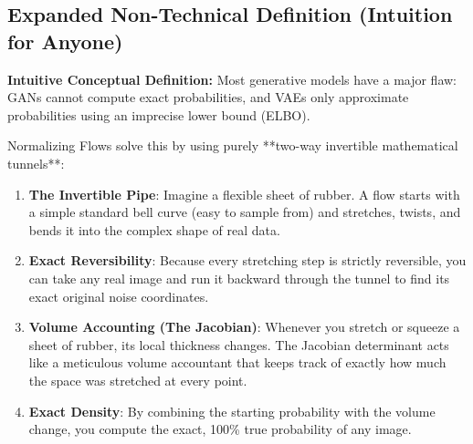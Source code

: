 \documentclass[11pt,a4paper]{article}
\theoremstyle{definition}
\begin{document}
\subsection{Expanded Non-Technical Definition (Intuition for Anyone)}
\textbf{Intuitive Conceptual Definition:}
Most generative models have a major flaw: GANs cannot compute exact probabilities, and VAEs only approximate probabilities using an imprecise lower bound (ELBO).

Normalizing Flows solve this by using purely **two-way invertible mathematical tunnels**:
\begin{enumerate}
    \item \textbf{The Invertible Pipe}: Imagine a flexible sheet of rubber. A flow starts with a simple standard bell curve (easy to sample from) and stretches, twists, and bends it into the complex shape of real data.
    \item \textbf{Exact Reversibility}: Because every stretching step is strictly reversible, you can take any real image and run it backward through the tunnel to find its exact original noise coordinates.
    \item \textbf{Volume Accounting (The Jacobian)}: Whenever you stretch or squeeze a sheet of rubber, its local thickness changes. The Jacobian determinant acts like a meticulous volume accountant that keeps track of exactly how much the space was stretched at every point.
    \item \textbf{Exact Density}: By combining the starting probability with the volume change, you compute the exact, 100\% true probability of any image.
\end{enumerate}
\end{document}
